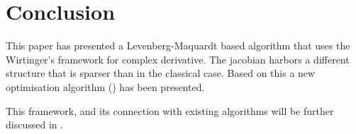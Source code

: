 \section{Conclusion}

This paper has presented a Levenberg-Maquardt based algorithm that
uses the Wirtinger's framework for complex derivative. The jacobian
harbors a different structure that is sparser than in the classical
case. Based on this a new optimisation algorithm (\COH) has been
presented.

This framework, and its connection with existing algorithms will be
further discussed in \citet[][in prep.]{SmirnovTasse14}.
